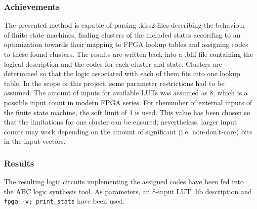 \subsubsection{Achievements}
\label{subsubsec:Achievements}

The presented method is capable of parsing .kiss2 files describing the behaviour of finite state machines, finding clusters of the included states
according to an optimization towards their mapping to FPGA lookup tables and assigning codes to these found clusters. The results are written back into a .blif file containing the logical description and the codes for each cluster and state. Clusters are determined so that the logic associated with each of them fits into one lookup table. In the scope of this project, some parameter restrictions had to be assumed. The amount of inputs for available LUTs was assumed as 8, which is a possible input count in modern FPGA series. For thenumber of external inputs of the finite state machine, the soft limit of 4 is used. This value has been chosen so that the limitations for one cluster can be ensured; nevertheless, larger input counts may work depending on the amount of significant (i.e. non-don't-care) bits in the input vectors.

\subsubsection{Results}
\label{subsubsec:Results}

The resulting logic circuits implementing the assigned codes have been fed into the ABC logic synthesis tool. As parameters, an 8-input LUT .lib description and \texttt{fpga -v; print\_stats} have been used.







